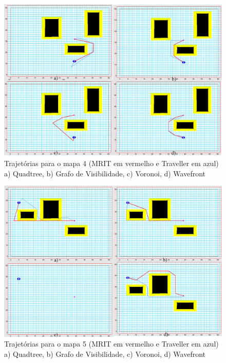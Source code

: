 \begin{figure}[h]
	\centering
	\label{fig42}
		\includegraphics[keepaspectratio=true,scale=0.25]{figuras/mapa4.jpg}
	\caption{Trajetórias para o mapa 4 (MRIT em vermelho e Traveller em azul) a) Quadtree, b) Grafo de Visibilidade, c) Voronoi, d) Wavefront}
\end{figure}

\begin{figure}[h]
	\centering
	\label{fig43}
		\includegraphics[keepaspectratio=true,scale=0.25]{figuras/mapa5.jpg}
	\caption{Trajetórias para o mapa 5 (MRIT em vermelho e Traveller em azul) a) Quadtree, b) Grafo de Visibilidade, c) Voronoi, d) Wavefront}
\end{figure}

